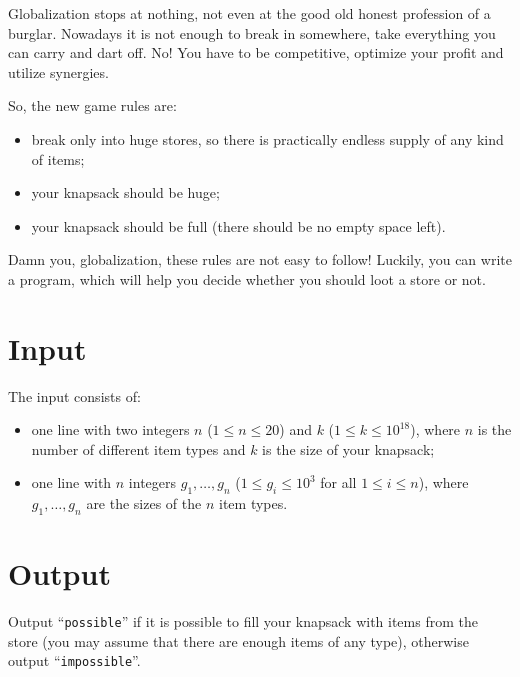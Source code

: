 
Globalization stops at nothing, not even at the good old honest profession of a burglar. Nowadays it is not enough to break in somewhere, take everything you can carry and dart off. No! You have to be competitive, optimize your profit and utilize synergies.

So, the new game rules are:
\begin{itemize}
	\item break only into huge stores, so there is practically endless supply of any kind of items;
	\item your knapsack should be huge;
	\item your knapsack should be full (there should be no empty space left).
\end{itemize}

Damn you, globalization, these rules are not easy to follow! Luckily, you can write a program, which will help you decide whether you should loot a store or not.

\section*{Input}

The input consists of:
\begin{itemize}
\item one line with two integers $n$ ($1 \le n \le 20$) and $k$ ($1 \le k \le 10^{18}$), where $n$ is the number of different item types and $k$ is the size of your knapsack;
\item one line with $n$ integers $g_1, \ldots, g_n$ ($1 \le g_i \le 10^3$ for all $1\leq i\leq n$), where $g_1, \ldots, g_n$ are the sizes of the $n$ item types.
\end{itemize}

\section*{Output}

Output ``{\tt possible}'' if it is possible to fill your knapsack with items from the store (you may assume that there are enough items of any type), otherwise output ``{\tt impossible}''.



